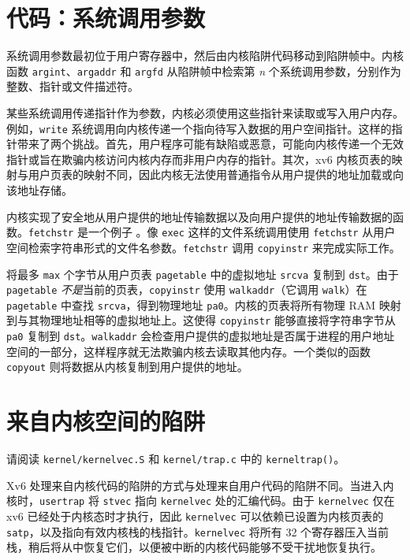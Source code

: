 \section{代码：系统调用参数}

系统调用参数最初位于用户寄存器中，然后由内核陷阱代码移动到陷阱帧中。内核函数 \lstinline{argint}、\lstinline{argaddr} 和 \lstinline{argfd} 从陷阱帧中检索第 \textit{n} 个系统调用参数，分别作为整数、指针或文件描述符。

某些系统调用传递指针作为参数，内核必须使用这些指针来读取或写入用户内存。例如，{\tt write} 系统调用向内核传递一个指向待写入数据的用户空间指针。这样的指针带来了两个挑战。首先，用户程序可能有缺陷或恶意，可能向内核传递一个无效指针或旨在欺骗内核访问内核内存而非用户内存的指针。其次，xv6 内核页表的映射与用户页表的映射不同，因此内核无法使用普通指令从用户提供的地址加载或向该地址存储。

内核实现了安全地从用户提供的地址传输数据以及向用户提供的地址传输数据的函数。{\tt fetchstr} 是一个例子 。像 {\tt exec} 这样的文件系统调用使用 {\tt fetchstr} 从用户空间检索字符串形式的文件名参数。\lstinline{fetchstr} 调用 \lstinline{copyinstr} 来完成实际工作。

 将最多 \lstinline{max} 个字节从用户页表 \lstinline{pagetable} 中的虚拟地址 \lstinline{srcva} 复制到 \lstinline{dst}。由于 \lstinline{pagetable} {\it 不是}当前的页表，\lstinline{copyinstr} 使用 {\tt walkaddr}（它调用 {\tt walk}）在 \lstinline{pagetable} 中查找 \lstinline{srcva}，得到物理地址 \lstinline{pa0}。内核的页表将所有物理 RAM 映射到与其物理地址相等的虚拟地址上。这使得 {\tt copyinstr} 能够直接将字符串字节从 {\tt pa0} 复制到 {\tt dst}。{\tt walkaddr}  会检查用户提供的虚拟地址是否属于进程的用户地址空间的一部分，这样程序就无法欺骗内核去读取其他内存。一个类似的函数 {\tt copyout} 则将数据从内核复制到用户提供的地址。

\section{来自内核空间的陷阱}
\label{s:ktraps}

请阅读 {\tt kernel/kernelvec.S} 和 {\tt kernel/trap.c} 中的 {\tt kerneltrap()}。

Xv6 处理来自内核代码的陷阱的方式与处理来自用户代码的陷阱不同。当进入内核时，{\tt usertrap} 将 {\tt stvec} 指向 {\tt kernelvec}  处的汇编代码。由于 {\tt kernelvec} 仅在 xv6 已经处于内核态时才执行，因此 {\tt kernelvec} 可以依赖已设置为内核页表的 {\tt satp}，以及指向有效内核栈的栈指针。{\tt kernelvec} 将所有 32 个寄存器压入当前栈，稍后将从中恢复它们，以便被中断的内核代码能够不受干扰地恢复执行。

